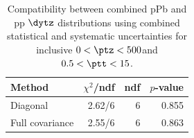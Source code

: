 \begin{table}[htp!]
\centering
\begin{tabular}{|l|r|r|r|}
\hline
Method & $\chi^2$/ndf & ndf & $p$-value \\
\hline
Diagonal & 2.62/6 & 6 & 0.855 \\
Full covariance & 2.55/6 & 6 & 0.863 \\
\hline
\end{tabular}
\caption{Compatibility between combined pPb and pp $\dytz$ distributions using combined statistical and systematic uncertainties for inclusive $0 < \ptz < 500$\GeV and $0.5 < \ptt < 15$\GeV.}
\label{table:chisq_deta}
\end{table}
